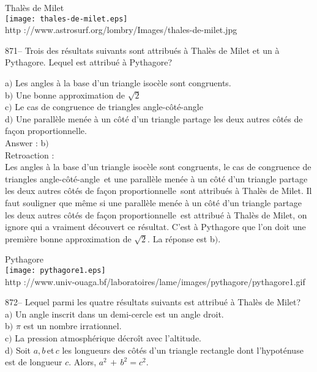 ﻿\documentclass[letterpaper, 12pt]{article}
\begin{document}
        \begin{center}
        Thal\`es de Milet\\
    \texttt{[image: thales-de-milet.eps]}\\
        {\footnotesize http
://www.astrosurf.org/lombry/Images/thales-de-milet.jpg}
    \end{center}

871-- Trois des r\'esultats suivants sont attribu\'es \`a Thal\`es
de Milet et un \`a Pythagore. Lequel est attribu\'e \`a Pythagore?

a$)$ Les angles \`a la base d'un triangle isoc\`ele sont congruents. \\
b$)$ Une bonne approximation de $\sqrt2$ \\
c$)$ Le cas de congruence de triangles angle-c\^ot\'e-angle \\
d$)$ Une parall\`ele men\'ee \`a un c\^ot\'e d'un triangle partage les deux
autres c\^ot\'es de fa\c con proportionnelle. \\

Answer : b$)$\\

Retroaction : \\
\og Les angles \`a la base d'un triangle isoc\`ele sont
congruents\fg , \og le cas de congruence de triangles
angle-c\^ot\'e-angle\fg\ et \og une parall\`ele men\'ee \`a un
c\^ot\'e d'un triangle partage les deux autres c\^ot\'es de fa\c con
proportionnelle\fg\ sont attribu\'es \`a Thal\`es de Milet.  Il faut
souligner que m\^eme si \og une parall\`ele men\'ee \`a un c\^ot\'e
d'un triangle partage les deux autres c\^ot\'es de fa\c con
proportionnelle\fg\ est attribu\'e \`a Thal\`es de Milet, on ignore
qui a vraiment d\'ecouvert ce r\'esultat. C'est \`a Pythagore que
l'on doit une premi\`ere bonne approximation de $\sqrt2$. La
r\'eponse est b$)$.

        \begin{center}
        Pythagore\\
    \texttt{[image: pythagore1.eps]}\\
        {\footnotesize http
://www.univ-ouaga.bf/laboratoires/lame/images/pythagore/pythagore1.gif}
    \end{center}

872-- Lequel parmi les quatre r\'esultats suivants est attribu\'e \`a
Thal\`es de Milet?\\

a$)$ Un angle inscrit dans un demi-cercle est un angle droit. \\
b$)$ $\pi$ est un nombre irrationnel. \\
c$)$ La pression atmosph\'erique d\'ecro\^it avec l'altitude. \\
d$)$ Soit $a,b\,$et$\,c$ les longueurs des c\^ot\'es d'un triangle rectangle
dont l'hypot\'enuse est de longueur $c$.  Alors, $a^2\,+\,b^2=c^2$.\\
\end{document}
